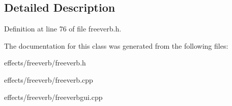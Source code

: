 \subsection{Detailed Description}


Definition at line 76 of file freeverb.\+h.



The documentation for this class was generated from the following files\+:\begin{DoxyCompactItemize}
\item 
effects/freeverb/freeverb.\+h\item 
effects/freeverb/freeverb.\+cpp\item 
effects/freeverb/freeverbgui.\+cpp\end{DoxyCompactItemize}
